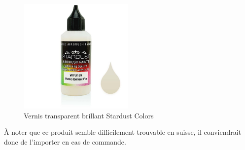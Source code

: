 \begin{figure}[H]
    \centering
    \includegraphics[width=0.5\textwidth]{assets/figures/etat_art/Stardust_vernis.jpg}
    \caption[Vernis transparent brillant Stardust Colors]{Vernis transparent brillant Stardust Colors\cite{Bouteille_vernis_stardust}}
\end{figure}
À noter que ce produit semble difficilement trouvable en suisse, il conviendrait donc de l'importer en cas de commande.
\begin{table}[H]
    \centering
    \caption{Résumé des avantages et inconvénients du vernis Stardust}
    \label{tab:Stardust_vernis}
\end{table}
\newpage
